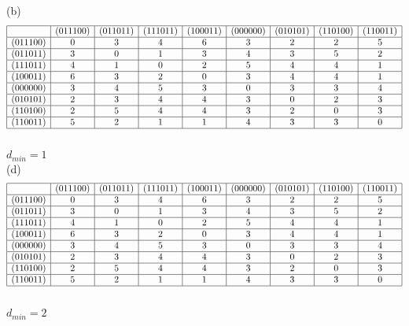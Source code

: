 \documentclass[a4paper, justified]{tufte-handout}
\begin{document}
\begin{solution}
  (b)
  $$
    \begin{array}{|c|c|c|c|c|c|c|c|c|}
      \hline         & (011100) & (011011) & (111011) & (100011) & (000000) & (010101) & (110100) & (110011) \\
      \hline(011100) & 0        & 3        & 4        & 6        & 3        & 2        & 2        & 5        \\
      \hline(011011) & 3        & 0        & 1        & 3        & 4        & 3        & 5        & 2        \\
      \hline(111011) & 4        & 1        & 0        & 2        & 5        & 4        & 4        & 1        \\
      \hline(100011) & 6        & 3        & 2        & 0        & 3        & 4        & 4        & 1        \\
      \hline(000000) & 3        & 4        & 5        & 3        & 0        & 3        & 3        & 4        \\
      \hline(010101) & 2        & 3        & 4        & 4        & 3        & 0        & 2        & 3        \\
      \hline(110100) & 2        & 5        & 4        & 4        & 3        & 2        & 0        & 3        \\
      \hline(110011) & 5        & 2        & 1        & 1        & 4        & 3        & 3        & 0        \\
      \hline
    \end{array}
  $$\\
  $d_{min}=1$\\
  (d)
  $$
    \begin{array}{|c|c|c|c|c|c|c|c|c|}
      \hline         & (011100) & (011011) & (111011) & (100011) & (000000) & (010101) & (110100) & (110011) \\
      \hline(011100) & 0        & 3        & 4        & 6        & 3        & 2        & 2        & 5        \\
      \hline(011011) & 3        & 0        & 1        & 3        & 4        & 3        & 5        & 2        \\
      \hline(111011) & 4        & 1        & 0        & 2        & 5        & 4        & 4        & 1        \\
      \hline(100011) & 6        & 3        & 2        & 0        & 3        & 4        & 4        & 1        \\
      \hline(000000) & 3        & 4        & 5        & 3        & 0        & 3        & 3        & 4        \\
      \hline(010101) & 2        & 3        & 4        & 4        & 3        & 0        & 2        & 3        \\
      \hline(110100) & 2        & 5        & 4        & 4        & 3        & 2        & 0        & 3        \\
      \hline(110011) & 5        & 2        & 1        & 1        & 4        & 3        & 3        & 0        \\
      \hline
    \end{array}
  $$\\
  $d_{min}=2$
\end{solution}
\end{document}
